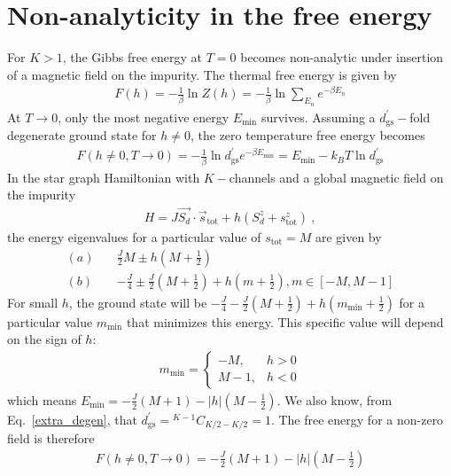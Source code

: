 \documentclass[12pt]{revtex4-2}
\begin{document}
\section{Non-analyticity in the free energy}
For \(K>1\), the Gibbs free energy at \(T=0\) becomes non-analytic under insertion of a magnetic field on the impurity. The thermal free energy is given by
\begin{align}
	F(h) = -\frac{1}{\beta}\ln Z(h) = -\frac{1}{\beta}\ln\sum_{E_n}e^{-\beta E_n}
\end{align}
At \(T \to 0\), only the most negative energy \(E_\text{min}\) survives. Assuming a \(d^\prime_\text{gs}-\)fold degenerate ground state for \(h \neq 0\), the zero temperature free energy becomes
\begin{align}
	F(h\neq 0, T\to 0) = -\frac{1}{\beta}\ln d^\prime_\text{gs}e^{-\beta E_\text{min}} = E_\text{min}- k_B T\ln d^\prime_\text{gs}
\end{align}
In the star graph Hamiltonian with \(K-\)channels and a global magnetic field on the impurity
\begin{align}
	H = J \vec{S_d}\cdot\vec{s}_\text{tot} + h\left(S_d^z + s^z_\text{tot}\right) ~,
\end{align}
the energy eigenvalues for a particular value of \(s_\text{tot}=M\) are given by
\begin{align}
	(a) \quad&\frac{J}{2}M \pm h\left(M + \frac{1}{2}\right)\\
	(b) \quad&-\frac{J}{4}\pm \frac{J}{2}\left(M + \frac{1}{2}\right) + h\left( m + \frac{1}{2} \right), m \in \left[-M, M-1\right] 
\end{align}
For small \(h\), the ground state will be \(-\frac{J}{4}- \frac{J}{2}\left(M + \frac{1}{2}\right) + h\left(m_\text{min} + \frac{1}{2} \right)\) for a particular value \(m_\text{min}\) that minimizes this energy. This specific value will depend on the sign of \(h\):
\begin{align}
	m_\text{min} = \begin{cases}
		-M, & h >0\\
		M-1,& h< 0
	\end{cases}
\end{align}
which means \(E_\text{min} = -\frac{J}{2}\left( M + 1 \right) - |h|\left(M - \frac{1}{2}\right)\). We also know, from Eq.~\ref{extra_degen}, that \(d^\prime_\text{gs} = {}^{K-1}C_{K/2 - K/2} = 1\).
The free energy for a non-zero field is therefore
\begin{align}
	F(h\neq 0, T\to 0) = -\frac{J}{2}\left( M + 1 \right) - |h|\left(M - \frac{1}{2}\right)
\end{align}
\end{document}
